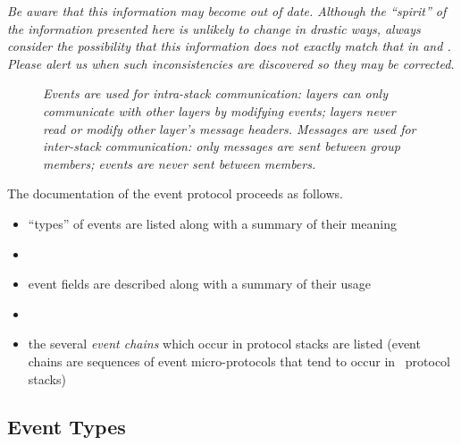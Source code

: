 \emph{Be aware that this information may become out of date.  Although the
``spirit'' of the information presented here is unlikely to change in
drastic ways, always consider the possibility that this information does
not exactly match that in  and .
Please alert us when such inconsistencies are discovered so they may be
corrected.}

\begin{figure}[tb]
\begin{center}
\end{center}
\caption{\em Events are used for intra-stack communication: layers can only
communicate with other layers by modifying events; layers never read or
modify other layer's message headers.  Messages are used for inter-stack
communication: only messages are sent between group members; events are
never sent between members.}
\label{comm:event}
\end{figure}

The documentation of the event protocol proceeds as follows.
\begin{itemize}
\item
``types'' of events are listed along with a summary of their meaning
\item
{}
\item
event fields are described along with a summary of their usage
\item
{}
\item
the several \emph{event chains} which occur in protocol stacks are listed
(event chains are sequences of event micro-protocols that tend to occur in
\ensemble\ protocol stacks)
\end{itemize}

\subsection{Event Types}

